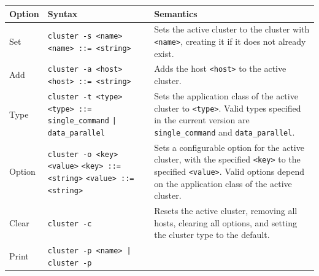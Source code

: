 \documentclass[twoside]{report}
\begin{document}
\begin{table}
  \begin{center}
    \begin{tabularx}{\textwidth}{|l|X|X|}
      \hline
      Option                        & Syntax                                                                                                                                                                                       & Semantics                                                                                                         \\ \hline
      Set                           & \texttt{cluster -s <name>} \newline
      \texttt{<name> ::= <string>}  & Sets the active cluster to the cluster with \texttt{<name>}, creating it if it does not already exist.
      \\ \hline
      Add                           & \texttt{cluster -a <host>} \newline
      \texttt{<host> ::= <string>}  & Adds the host \texttt{<host>} to the active cluster.
      \\ \hline
      Type                          & \texttt{cluster -t <type>} \newline
      \texttt{<type> ::= single\_command} \newline
      \texttt{| data\_parallel}     & Sets the application class of the active cluster to \texttt{<type>}. Valid types specified in the current version are \texttt{single\_command} and \texttt{data\_parallel}.
      \\ \hline
      Option                        & \texttt{cluster -o <key> <value>} \newline
      \texttt{<key> ::= <string>} \newline
      \texttt{<value> ::= <string>} & Sets a configurable option for the active cluster, with the specified \texttt{<key>} to the specified \texttt{<value>}. Valid options depend on the application class of the active cluster.
      \\ \hline
      Clear                         & \texttt{cluster -c}                                                                                                                                                                          & Resets the active cluster, removing all hosts, clearing all options, and setting the cluster type to the default.
      \\ \hline
      Print                         & \texttt{cluster -p <name> | cluster -p} \newline

\end{tabularx}
\end{center}
\end{table}
\end{document}
